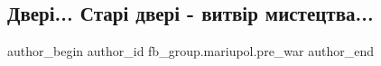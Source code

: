 
 
 
 
 

\subsection{Двері... Старі двері - витвір мистецтва...}
\label{sec:16_01_2023.fb.fb_group.mariupol.pre_war.1.dver___star__dver___}

\ifcmt
 author_begin
   author_id fb_group.mariupol.pre_war
 author_end
\fi

